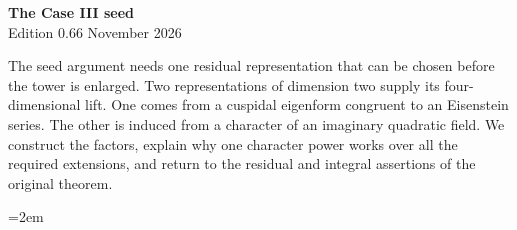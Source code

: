 \begin{center}
{\Large\bfseries The Case III seed}\\[4pt]
Edition 0.66  November 2026
\end{center}

The seed argument needs one residual representation that can be chosen
before the tower is enlarged. Two representations of dimension two
supply its four-dimensional lift. One comes from a cuspidal eigenform
congruent to an Eisenstein series. The other is induced from a character
of an imaginary quadratic field. We construct the factors, explain
why one character power works over all the required extensions,
and return to the residual and integral assertions of the original theorem.

\begingroup\emergencystretch=2em





\endgroup
